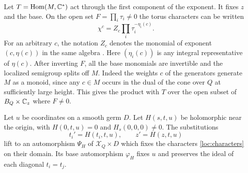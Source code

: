 Let $T=\operatorname{Hom}(M,\mathbb C^*)$ act through the first component of
the exponent. It fixes $z$ and the base. On the open set
$F=\prod_i\tau_i\ne0$ the torus characters can be written
\begin{equation}\label{loc:characters}
             \chi^c=Z_c\prod_i\tau_i^{-\eta_i(c)} .
\end{equation}
For an arbitrary $c$, the notation $Z_c$ denotes the monomial of
exponent $(c,\eta(c))$ in the same algebra
\cite[\S4.6 and \S5.3, Remark~(1)]{Alt}. Here $(\eta_i(c))$ is any
integral representative of $\eta(c)$.
After inverting $F$, all the base monomials are invertible and
the localized semigroup splits off $M$. Indeed the weights $c$ of the
generators generate $M$ as a monoid, since any $c\in M$ occurs in
the dual of the cone over $Q$ at sufficiently large height.
This gives the product with $T$ over the open subset of
$B_Q\times\mathbb C_z$ where $F\ne0$.

\begin{proposition}\label{loc:lift}
Let $u$ be coordinates on a smooth germ $D$. Let $H(s,t,u)$ be
holomorphic near the origin, with $H(0,t,u)=0$ and $H_s(0,0,0)\ne0$.
The substitutions
\begin{equation}\label{loc:change}
    t_i'=H(t_i,t,u),\qquad z'=H(z,t,u)
\end{equation}
lift to an automorphism $\Psi_H$ of $\mathcal X_Q\times D$ which fixes
the characters \eqref{loc:characters} on their domain. Its base
automorphism $\varphi_H$ fixes $u$ and preserves the ideal of each
diagonal $t_i=t_j$.
\end{proposition}


